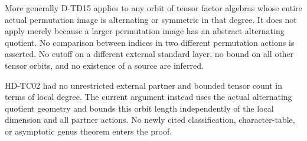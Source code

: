 More generally D-TD15 applies to any orbit of tensor factor
algebras whose entire actual permutation image is alternating
or symmetric in that degree. It does not apply merely because a
larger permutation image has an abstract alternating quotient.
No comparison between indices in two different permutation
actions is asserted. No cutoff on a different external standard
layer, no bound on all other tensor orbits, and no existence of
a source are inferred.

HD-TC02 had no unrestricted external partner and bounded tensor
count in terms of local degree. The current argument instead uses
the actual alternating quotient geometry and bounds this orbit
length independently of the local dimension and all partner
actions. No newly cited classification, character-table, or
asymptotic genus theorem enters the proof.
